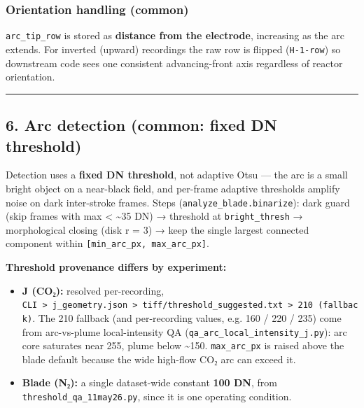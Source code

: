 \documentclass[
  11pt,
]{article}
\providecommand{\tightlist}{%
  \setlength{\itemsep}{0pt}\setlength{\parskip}{0pt}}
\begin{document}
\hypertarget{orientation-handling-common}{%
\subsubsection{Orientation handling
(common)}\label{orientation-handling-common}}

\texttt{arc\_tip\_row} is stored as \textbf{distance from the
electrode}, increasing as the arc extends. For inverted (upward)
recordings the raw row is flipped (\texttt{H-1-row}) so downstream code
sees one consistent advancing-front axis regardless of reactor
orientation.

\begin{center}\rule{0.5\linewidth}{0.5pt}\end{center}

\hypertarget{6-arc-detection-common-fixed-dn-threshold}{%
\subsection{6. Arc detection (common: fixed DN
threshold)}\label{6-arc-detection-common-fixed-dn-threshold}}

Detection uses a \textbf{fixed DN threshold}, not adaptive Otsu --- the
arc is a small bright object on a near-black field, and per-frame
adaptive thresholds amplify noise on dark inter-stroke frames. Steps
(\texttt{analyze\_blade.binarize}): dark guard (skip frames with max
\textless{} \textasciitilde35 DN) → threshold at \texttt{bright\_thresh}
→ morphological closing (disk r = 3) → keep the single largest connected
component within \texttt{{[}min\_arc\_px,\ max\_arc\_px{]}}.

\textbf{Threshold provenance differs by experiment:}

\begin{itemize}
\tightlist
\item
  \textbf{J (CO₂):} resolved per-recording,
  \texttt{CLI\ \textgreater{}\ j\_geometry.json\ \textgreater{}\ tiff/threshold\_suggested.txt\ \textgreater{}\ 210\ (fallback)}.
  The 210 fallback (and per-recording values, e.g. 160 / 220 / 235) come
  from arc-vs-plume local-intensity QA
  (\texttt{qa\_arc\_local\_intensity\_j.py}): arc core saturates near
  255, plume below \textasciitilde150. \texttt{max\_arc\_px} is raised
  above the blade default because the wide high-flow CO₂ arc can exceed
  it.
\item
  \textbf{Blade (N₂):} a single dataset-wide constant \textbf{100 DN},
  from \texttt{threshold\_qa\_11may26.py}, since it is one operating
  condition.
\end{itemize}
\end{document}
